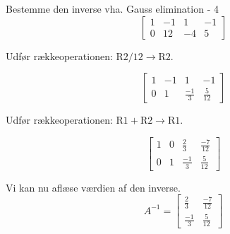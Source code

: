 \documentclass{article}
\begin{document}
\begin{exercise}{Bestemme den inverse vha. Gauss elimination - 4}
	\hint
	\[
	\left[\begin{array}{cc|cc}
	1 & -1 & 1 & -1 \\ 
	0 & 12 & -4 & 5
	\end{array} \right]
	\]
	
	\hint
	Udfør rækkeoperationen: $\text{R2} / 12 \to \text{R2}$.
	
	\hint
	\[
	\left[\begin{array}{cc|cc}
	1 & -1 & 1 & -1 \\ 
	0 & 1 & \frac{-1}{3} & \frac{5}{12}
	\end{array} \right]
	\]
	
	\hint
	Udfør rækkeoperationen: $\text{R1} + \text{R2} \to \text{R1}$.
	
	\hint
	\[
	\left[\begin{array}{cc|cc}
	1 & 0 & \frac{2}{3} & \frac{-7}{12} \\ 
	0 & 1 & \frac{-1}{3} & \frac{5}{12}
	\end{array} \right]
	\]
	
	\hint
	Vi kan nu aflæse værdien af den inverse.
	\[
	A^{-1} = \left[\begin{array}{cc}
	\frac{2}{3} & \frac{-7}{12} \\ 
	\frac{-1}{3} & \frac{5}{12}
	\end{array} \right]
	\]
	
	
\end{exercise}
\end{document}
